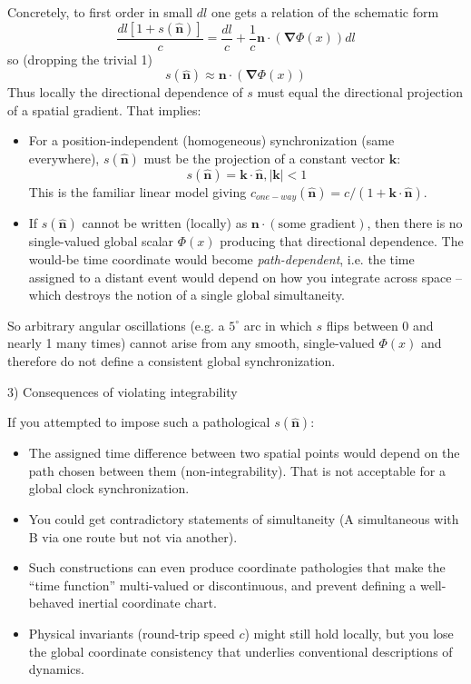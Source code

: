 \documentclass[a4paper]{article}
\theoremstyle{plain}
\theoremstyle{definition}
\newcommand{\vect}[1]{\mathbf{#1}}
\newcommand{\hatvec}[1]{\hat{\mathbf{#1}}}
\newcommand{\del}{\bm{\nabla}}
\begin{document}
Concretely, to first order in small $dl$ one gets a relation of the
schematic form
\begin{equation}
\frac{dl[1+s(\hatvec{n})]}{c}
  = \frac{dl}{c} + \frac{1}{c} \vect{n} \cdot (\del \Phi(x)) dl
\end{equation}
so (dropping the trivial 1)
\begin{equation}
s(\hatvec{n}) \approx \vect{n} \cdot (\del \Phi (x))
\end{equation}
Thus locally the directional dependence of $s$ must equal the
directional projection of a spatial gradient.  That implies:
\begin{itemize}
\item For a position-independent (homogeneous) synchronization (same
  everywhere), $s(\hatvec{n})$ must be the projection of a constant
  vector $\vect{k}$:
\begin{equation}
s(\hatvec{n}) = \vect{k} \cdot \hatvec{n}, |\vect{k}| < 1
\end{equation}
  This is the familiar linear model giving
  $c_{one-way}(\hatvec{n}) = c/(1 + \vect{k} \cdot \hatvec{n})$.
\item If $s(\hatvec{n})$ cannot be written (locally) as $\vect{n}
  \cdot (\text{some gradient})$, then there is no single-valued global
  scalar $\Phi(x)$ producing that directional dependence.  The
  would-be time coordinate would become {\em path-dependent}, i.e. the
  time assigned to a distant event would depend on how you integrate
  across space -- which destroys the notion of a single global
  simultaneity.
\end{itemize}

So arbitrary angular oscillations (e.g. a $5^{\circ}$ arc in which $s$
flips between 0 and nearly 1 many times) cannot arise from any smooth,
single-valued $\Phi(x)$ and therefore do not define a consistent
global synchronization.

3) Consequences of violating integrability

If you attempted to impose such a pathological $s(\hatvec{n})$:
\begin{itemize}
\item The assigned time difference between two spatial points would
  depend on the path chosen between them (non-integrability).  That is
  not acceptable for a global clock synchronization.
\item You could get contradictory statements of simultaneity (A
  simultaneous with B via one route but not via another).
\item Such constructions can even produce coordinate pathologies that
  make the ``time function'' multi-valued or discontinuous, and
  prevent defining a well-behaved inertial coordinate chart.
\item Physical invariants (round-trip speed $c$) might still hold
  locally, but you lose the global coordinate consistency that
  underlies conventional descriptions of dynamics.
\end{itemize}
\end{document}
